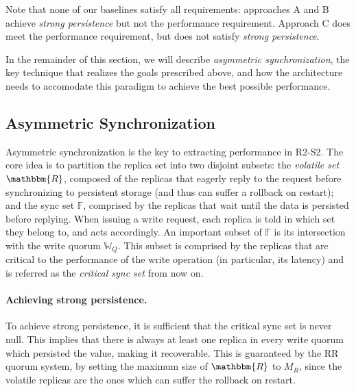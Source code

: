Note that none of our baselines satisfy all requirements:
approaches A and B achieve
\emph{strong persistence} but not the performance requirement.
Approach C does meet the performance
requirement, but does not satisfy \emph{strong persistence}.

In the remainder of this section, we will describe
\emph{asymmetric synchronization}, the key technique that realizes the
goals prescribed above, and how the architecture needs to
accomodate this paradigm to achieve the best possible
performance.

\subsection{Asymmetric Synchronization}\label{ssec:asymmetric_synchronization}

Asymmetric synchronization is the key to extracting performance
in \ac{R2-S2}. The core idea is to partition the replica set
into two disjoint subsets: the \emph{volatile set}
$\mathbbm{R}$, composed of the replicas that eagerly reply to the
request before synchronizing to persistent storage (and thus can
suffer a rollback on restart); and the sync set $\mathbb{F}$,
comprised by the
replicas that wait until the data is persisted before replying.
When issuing a write request, each replica is told in which set
they belong to, and acts accordingly. An important subset of
$\mathbb{F}$ is its intersection with the write quorum
$\mathbb{W}_Q$. This subset is comprised by the replicas that are
critical to the performance of the write operation (in
particular, its latency) and is referred as the \emph{critical
sync set} from now on.

\paragraph{Achieving strong persistence.} To achieve strong
persistence, it is sufficient that the critical sync set is
never null. This implies that there is always at least one
replica in every write quorum which persisted the value, making
it recoverable. This is guaranteed by the \ac{RR} quorum
system, by setting the maximum size of $\mathbbm{R}$ to $M_R$,
since the volatile replicas are the ones which can suffer the rollback on
restart.


